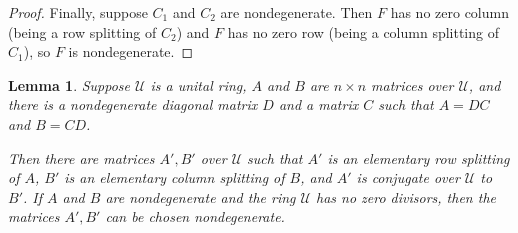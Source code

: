 \documentclass{amsart}
\newtheorem{lemma}[theorem]{Lemma}
\theoremstyle{definition}
\theoremstyle{remark}
\numberwithin{equation}{section}
\begin{document}
{\begin{proof}
Finally, suppose $C_1$ and $C_2$ are nondegenerate. 
Then $F$ has no zero column (being a row splitting of $C_2$) 
and $F$ has no zero row (being a column splitting of $C_1$), 
so $F$ is nondegenerate. 
\end{proof} 

\begin{lemma}\label{diagrefactoconj}
Suppose $\mathcal U $ is a unital ring, $A$ and $B$ are $n\times n$ 
matrices over $\mathcal U$, and there is a nondegenerate diagonal 
matrix $D$ and a matrix $C$ such that $A=DC$ and $B=CD$. 

Then there are matrices $A',B'$ over $\mathcal U$ such that 
$A'$ is an elementary row splitting of $A$, 
$B'$ is an elementary column splitting of $B$, 
and $A'$ is conjugate over $\mathcal U$ to $B'$. 
If $A$ and $B$ are nondegenerate and the ring $\mathcal U$ 
has no zero divisors, then the matrices $A',B'$ 
can be chosen nondegenerate. 
\end{lemma} 

}
\end{document}
